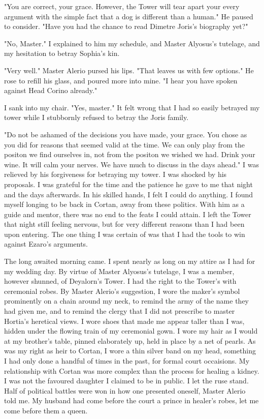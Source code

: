 \documentclass{article}
\begin{document}
"You are correct, your grace. However, the Tower will tear apart your every argument with the simple fact that a dog is different than a human." He paused to consider. "Have you had the chance to read Dimetre Joris's biography yet?"

"No, Master." I explained to him my schedule, and Master Alyosus's tutelage, and my hesitation to betray Sophia's kin.

"Very well." Master Alerio pursed his lips. "That leaves us with few options." He rose to refill his glass, and poured more into mine. "I hear you have spoken against Head Corino already." 

I sank into my chair. "Yes, master." It felt wrong that I had so easily betrayed my tower while I stubbornly refused to betray the Joris family.

"Do not be ashamed of the decisions you have made, your grace. You chose as you did for reasons that seemed valid at the time. We can only play from the positon we find ourselves in, not from the positon we wished we had. Drink your wine. It will calm your nerves. We have much to discuss in the days ahead." I was relieved by his forgiveness for betraying my tower. I was shocked by his proposals. I was grateful for the time and the patience he gave to me that night and the days afterwards. In his skilled hands, I felt I could do anything. I found myself longing to be back in Cortan, away from these politics. With him as a guide and mentor, there was no end to the feats I could attain. I left the Tower that night still feeling nervous, but for very different reasons than I had been upon entering. The one thing I was certain of was that I had the tools to win against Ezaro's arguments. 

\vspace{.5cm}

The long awaited morning came. I spent nearly as long on my attire as I had for my wedding day. By virtue of Master Alyosus's tutelage, I was a member, however shunned, of Deyalorn's Tower. I had the right to the Tower's with ceremonial robes. By Master Alerio's suggestion, I wore the maker's symbol prominently on a chain around my neck, to remind the army of the name they had given me, and to remind the clergy that I did not prescribe to master Hortia's heretical views. I wore shoes that made me appear taller than I was, hidden under the flowing train of my ceremonial gown. I wore my hair as I would at my brother's table, pinned elaborately up, held in place by a net of pearls. As was my right as heir to Cortan, I wore a thin silver band on my head, something I had only done a handful of times in the past, for formal court occaisions. My relationship with Cortan was more complex than the process for healing a kidney. I was not the favoured daughter I claimed to be in public. I let the ruse stand. Half of political battles were won in how one presented oneself, Master Alerio told me. My husband had come before the court a prince in healer's robes, let me come before them a queen.
\end{document}
